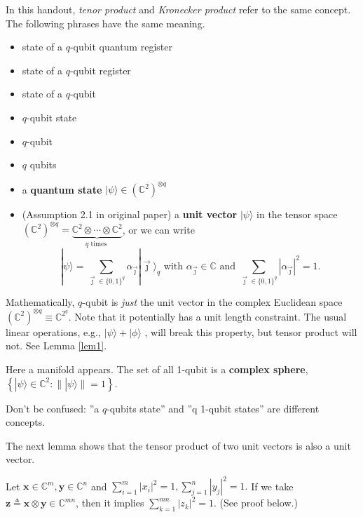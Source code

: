 In this handout, \textit{tenor product} and \textit{Kronecker product} refer to the same concept. The following phrases have the same meaning.
\begin{itemize}
    \item state of a $q$-qubit quantum register
    \item state of a $q$-qubit register
    \item state of a $q$-qubit
    \item $q$-qubit state
    \item $q$-qubit
    \item $q$ qubits
    \item a \textbf{quantum state} $|\psi\rangle \in\left(\mathbb{C}^2\right)^{\otimes q}$
    \item (Assumption 2.1 in original paper) a \textbf{unit vector} $|\psi\rangle$ in the tensor space $\left(\mathbb{C}^2\right)^{\otimes q}=\underbrace{\mathbb{C}^2 \otimes \cdots \otimes \mathbb{C}^2}_{q \text { times }}$, or we can write
    \begin{equation}
    |\psi\rangle=\sum_{\vec{\jmath} \in\{0,1\}^q} \alpha_{\vec{\jmath}}|\vec{\jmath}\rangle_q \text { with } \alpha_{\vec{\jmath}} \in \mathbb{C} \text { and } \sum_{\vec{\jmath} \in\{0,1\}^q}\left|\alpha_{\vec{\jmath}}\right|^2=1.
\end{equation}

\end{itemize}

\begin{remark}
    Mathematically, $q$-qubit is \textit{just} the unit vector in the complex Euclidean space $\left(\mathbb{C}^2\right)^{\otimes q} \equiv \mathbb{C}^{2^q}$. Note that it potentially has a unit length constraint. The usual linear operations, e.g., $|\psi\rangle + |\phi\rangle$ , will break this property, but tensor product will not. See Lemma \ref{lem1}.
\end{remark}

\begin{remark}
    Here a manifold appears. The set of all 1-qubit is a \textbf{complex sphere}, $\left\{|\psi\rangle \in \mathbb{C}^{2}:\||\psi\rangle\|=1\right\}$.
\end{remark}

\begin{remark}
    Don't be confused: ''a $q$-qubits state'' and ''q 1-qubit states'' are different concepts.
\end{remark}

The next lemma shows that the tensor product of two unit vectors is also a unit vector.
\begin{lemma}\label{lem1}
 Let $\mathbf{x} \in \mathbb{C}^m,\mathbf{y} \in \mathbb{C}^n$ and $\sum_{i=1}^m\left|x_i\right|^2=1, \sum_{j=1}^n\left|y_j\right|^2=1.$ 
 If we take
 $\mathbf{z} \triangleq \mathbf{x} \otimes \mathbf{y}\in\mathbb{C}^{mn}$, then it implies $\sum_{k=1}^{mn}\left|z_k\right|^2=1$. (See proof below.)
\end{lemma}

